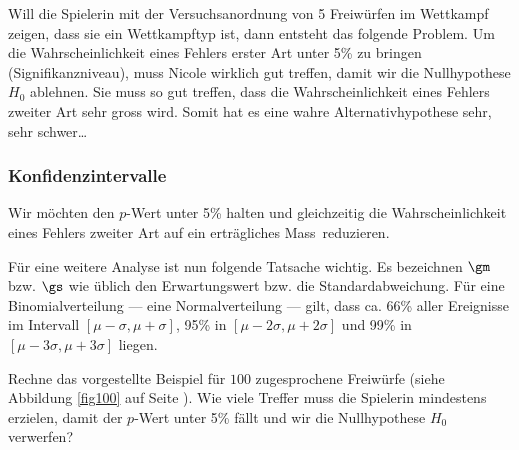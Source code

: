 \documentclass[%
11pt,%
twoside,%
titlepage,%
german,%
headsepline%
]{scrartcl}
\begin{document}
Will die Spielerin mit der Versuchsanordnung von 5 Freiwürfen im Wettkampf zeigen, dass sie ein Wettkampftyp ist, dann entsteht das folgende Problem. Um die Wahrscheinlichkeit eines Fehlers erster Art unter 5\% zu bringen (Signifikanzniveau), muss Nicole wirklich gut treffen, damit wir die Nullhypothese $H_0$ ablehnen. Sie muss so gut treffen, dass die Wahrscheinlichkeit eines Fehlers zweiter Art sehr gross wird. Somit hat es eine wahre Alternativhypothese sehr, sehr schwer\dots
{}

\subsubsection{Konfidenzintervalle}

Wir möchten den $p$-Wert unter 5\% halten und gleichzeitig die Wahrscheinlichkeit eines Fehlers zweiter Art auf ein \glqq erträgliches Mass\grqq\ reduzieren.

\begin{bem}
Für eine weitere Analyse ist nun folgende Tatsache wichtig. Es bezeichnen $\gm$ bzw. $\gs$ wie üblich den Erwartungswert bzw. die Standardabweichung. Für eine Binomialverteilung --- eine Normalverteilung --- gilt, dass ca. 66\% aller Ereignisse im Intervall $[\mu-\sigma,\mu+\sigma]$, 95\% in $[\mu-2\sigma,\mu+2\sigma]$ und 99\% in $[\mu-3\sigma,\mu+3\sigma]$ liegen.
\end{bem}

\begin{ueb}
Rechne das vorgestellte Beispiel für $100$ zugesprochene Freiwürfe (siehe Abbildung \ref{fig100} auf Seite \pageref{fig100}). Wie viele Treffer muss die Spielerin mindestens erzielen, damit der $p$-Wert unter 5\% fällt und wir die Nullhypothese $H_0$ verwerfen?
\end{ueb}
\end{document}
